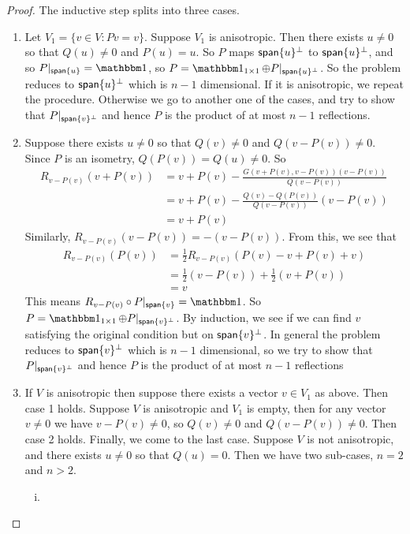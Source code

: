 \begin{proof}
    The inductive step splits into three cases.
    \begin{enumerate}
    \item {
    Let $V_1 = \{v\in V :Pv = v\}$. Suppose $V_1$ is anisotropic. Then there exists $u\neq 0$ so that $Q(u)\neq 0$ and $P(u) = u$. So $P$ maps $\operatorname{\textsf{span}}\{u\}^\perp$ to $\operatorname{\textsf{span}}\{u\}^\perp$, and so $P|_{\Span\{u\}} = \One$, so $P = \One_{1\times 1} \oplus P|_{\Span\{u\}^\perp}$. So the problem reduces to $\operatorname{\textsf{span}}\{u\}^\perp$ which is $n-1$ dimensional. If it is anisotropic, we repeat the procedure. Otherwise we go to another one of the cases, and try to show that $P|_{\operatorname{\textsf{span}}\{v\}^\perp}$ and hence $P$ is the product of at most $n-1$ reflections.
    }
    \item {
    Suppose there exists $u\neq 0$ so that $Q(v)\neq 0$ and $Q(v-P(v))\neq 0$. Since $P$ is an isometry, $Q(P(v))=Q(u)\neq 0$. So \begin{align*}R_{v-P(v)}(v+P(v)) &= v+P(v) - \frac{G(v+P(v),v-P(v))(v-P(v))}{Q(v-P(v))} \\&= v+P(v) - \frac{Q(v)-Q(P(v))}{Q(v-P(v))}(v-P(v)) \\&= v+P(v)\end{align*}
    Similarly, $R_{v-P(v)}(v-P(v))=-(v-P(v))$. From this, we see that 
    \begin{align*}
        R_{v-P(v)}(P(v)) &= \frac{1}{2}R_{v-P(v)}(P(v)-v + P(v)+v)\\
        &= \frac{1}{2}(v-P(v)) + \frac{1}{2}(v+P(v))\\
        &= v
    \end{align*}
    This means $R_{v-P(v)}\circ P|_{\Span\{v\}} = \One$. So $P = \One_{1\times 1} \oplus P|_{\Span\{v\}^\perp}$. By induction, we see if we can find $v$ satisfying the original condition but on $\operatorname{\textsf{span}}\{v\}^\perp$. In general the problem reduces to $\operatorname{\textsf{span}}\{v\}^\perp$ which is $n-1$ dimensional, so we try to show that $P|_{\operatorname{\textsf{span}}\{v\}^\perp}$ and hence $P$ is the product of at most $n-1$ reflections
    }
    \item {
    If $V$ is anisotropic then suppose there exists a vector $v \in V_1$ as above. Then case 1 holds. Suppose $V$ is anisotropic and $V_1$ is empty, then for any vector $v\neq 0$ we have $v-P(v)\neq 0$, so $Q(v)\neq 0$ and $Q(v-P(v))\neq 0$. Then case 2 holds. Finally, we come to the last case. Suppose $V$ is not anisotropic, and there exists $u \neq 0$ so that $Q(u)=0$. Then we have two sub-cases, $n=2$ and $n>2$.
    \begin{enumerate}[i)]
    \item {
}
\end{enumerate}}
\end{enumerate}
\end{proof}
